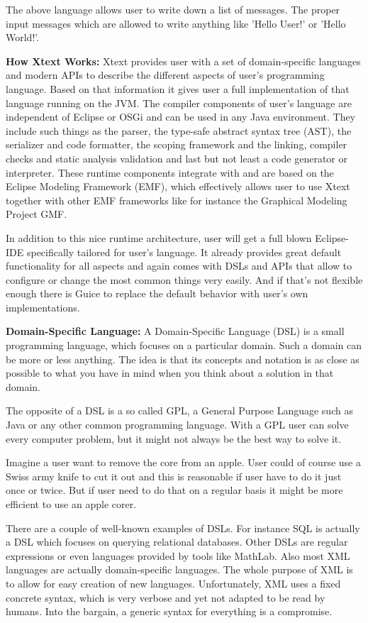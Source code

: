 	The above language allows user to write down a list of messages. The proper input messages which are allowed to write anything like 'Hello User!' or 'Hello World!'.

		
	\textbf{How Xtext Works:}
	Xtext provides user with a set of domain-specific languages and modern APIs to describe the different aspects of user's programming language. Based on that information it gives user a full implementation of that language running on the JVM. The compiler components of user's language are independent of Eclipse or OSGi and can be used in any Java environment. They include such things as the parser, the type-safe abstract syntax tree (AST), the serializer and code formatter, the scoping framework and the linking, compiler checks and static analysis validation and last but not least a code generator or interpreter. These runtime components integrate with and are based on the Eclipse Modeling Framework (EMF), which effectively allows user to use Xtext together with other EMF frameworks like for instance the Graphical Modeling Project GMF.
	
	In addition to this nice runtime architecture, user will get a full blown Eclipse-IDE specifically tailored for user's language. It already provides great default functionality for all aspects and again comes with DSLs and APIs that allow to configure or change the most common things very easily. And if that's not flexible enough there is Guice to replace the default behavior with user's own implementations.
	
	\textbf{Domain-Specific Language:}
	A Domain-Specific Language (DSL) is a small programming language, which focuses on a particular domain. Such a domain can be more or less anything. The idea is that its concepts and notation is as close as possible to what you have in mind when you think about a solution in that domain. 
		
	The opposite of a DSL is a so called GPL, a General Purpose Language such as Java or any other common programming language. With a GPL user can solve every computer problem, but it might not always be the best way to solve it.
	
	Imagine a user want to remove the core from an apple. User could of course use a Swiss army knife to cut it out and this is reasonable if user have to do it just once or twice. But if user need to do that on a regular basis it might be more efficient to use an apple corer.
	
	There are a couple of well-known examples of DSLs. For instance SQL is actually a DSL which focuses on querying relational databases. Other DSLs are regular expressions or even languages provided by tools like MathLab. Also most XML languages are actually domain-specific languages. The whole purpose of XML is to allow for easy creation of new languages. Unfortunately, XML uses a fixed concrete syntax, which is very verbose and yet not adapted to be read by humans. Into the bargain, a generic syntax for everything is a compromise.
	

